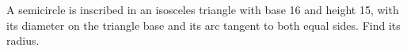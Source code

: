 A semicircle is inscribed in an isosceles triangle with base 16 and height 15, with its diameter on the triangle base and its arc tangent to both equal sides. Find its radius.

